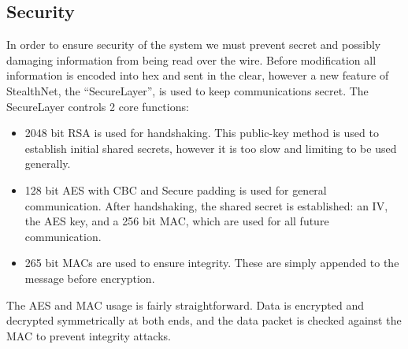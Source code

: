 \subsection{Security}
In order to ensure security of the system we must prevent secret and possibly damaging information from being read over the wire.
Before modification all information is encoded into hex and sent in the clear, however a new feature of StealthNet, the ``SecureLayer'', is used to keep communications secret.
The SecureLayer controls 2 core functions:
\begin{itemize}
	\item 2048 bit RSA is used for handshaking.  This public-key method is used to establish initial shared secrets, however it is too slow and limiting to be used generally.
	\item 128 bit AES with CBC and Secure padding is used for general communication.  After handshaking, the shared secret is established: an IV, the AES key, and a 256 bit MAC, which are used for all future communication.
	\item 265 bit MACs are used to ensure integrity.  These are simply appended to the message before encryption.
\end{itemize}
The AES and MAC usage is fairly straightforward.  Data is encrypted and decrypted symmetrically at both ends, and the data packet is checked against the MAC to prevent integrity attacks.

